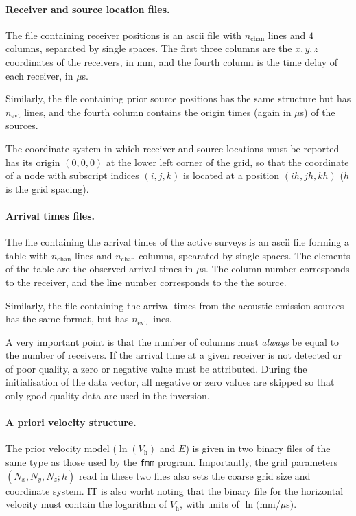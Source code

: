 \documentclass{article}
\begin{document}
\paragraph{Receiver and source location files.} The file containing receiver positions is an ascii file with $n_\mathrm{chan}$ lines and $4$ columns, separated by single spaces. The first three columns are the $x,y,z$ coordinates of the receivers, in mm, and the fourth column is the time delay of each receiver, in $\mu$s.

Similarly, the file containing prior source positions has the same structure but has $n_\mathrm{evt}$ lines, and the fourth column contains the origin times (again in $\mu$s) of the sources.

The coordinate system in which receiver and source locations must be reported has its origin $(0,0,0)$ at the lower left corner of the grid, so that the coordinate of a node with subscript indices $(i,j,k)$ is located at a position $(ih, jh, kh)$ ($h$ is the grid spacing).

\paragraph{Arrival times files.} The file containing the arrival times of the active surveys is an ascii file forming a table with $n_\mathrm{chan}$ lines and $n_\mathrm{chan}$ columns, spearated by single spaces. The elements of the table are the observed arrival times in $\mu$s. The column number corresponds to the receiver, and the line number corresponds to the the source.

Similarly, the file containing the arrival times from the acoustic emission sources has the same format, but has $n_\mathrm{evt}$ lines.

A very important point is that the number of columns must \emph{always} be equal to the number of receivers. If the arrival time at a given receiver is not detected or of poor quality, a zero or negative value must be attributed. During the initialisation of the data vector, all negative or zero values are skipped so that only good quality data are used in the inversion.

\paragraph{A priori velocity structure.} The prior velocity model ($\ln(V_\mathrm{h})$ and $E$) is given in two binary files of the same type as those used by the \verb+fmm+ program. Importantly, the grid parameters $(N_x,N_y,N_z;h)$ read in these two files also sets the coarse grid size and coordinate system. IT is also worht noting that the binary file for the horizontal velocity must contain the logarithm of $V_\mathrm{h}$, with units of $\ln($mm/$\mu$s$)$.
\end{document}

